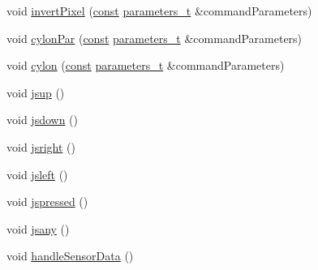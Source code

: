 \begin{DoxyCompactItemize}
\item 
void \hyperlink{class_m_q_t_tsense_h_a_t_ae5172290839c6af0821f41bae9cf30c7}{invert\+Pixel} (\hyperlink{functions__c_8js_afacfd9c985d225bb07483b887a801b6f}{const} \hyperlink{_json_m_q_t_t_8h_ad3b3bd6544a775cf1e31cd71610c5765}{parameters\+\_\+t} \&command\+Parameters)
\item 
void \hyperlink{class_m_q_t_tsense_h_a_t_a0c2faf77463954149558afc54f965f65}{cylon\+Par} (\hyperlink{functions__c_8js_afacfd9c985d225bb07483b887a801b6f}{const} \hyperlink{_json_m_q_t_t_8h_ad3b3bd6544a775cf1e31cd71610c5765}{parameters\+\_\+t} \&command\+Parameters)
\item 
void \hyperlink{class_m_q_t_tsense_h_a_t_ad70cc61332aefd376e2fafd026e51144}{cylon} (\hyperlink{functions__c_8js_afacfd9c985d225bb07483b887a801b6f}{const} \hyperlink{_json_m_q_t_t_8h_ad3b3bd6544a775cf1e31cd71610c5765}{parameters\+\_\+t} \&command\+Parameters)
\item 
void \hyperlink{class_m_q_t_tsense_h_a_t_a5d0f57ce2e94813cfa2279d17e4905ae}{jsup} ()
\item 
void \hyperlink{class_m_q_t_tsense_h_a_t_a49af5e2cafdc045b070601e2046ae32c}{jsdown} ()
\item 
void \hyperlink{class_m_q_t_tsense_h_a_t_a94f4010486bd20e7f1ffd602ab4a6df8}{jsright} ()
\item 
void \hyperlink{class_m_q_t_tsense_h_a_t_ab02c2741dda318559e3f22b85ecd9b28}{jsleft} ()
\item 
void \hyperlink{class_m_q_t_tsense_h_a_t_a4a4c34f1818a47a9e111050cdaf94157}{jspressed} ()
\item 
void \hyperlink{class_m_q_t_tsense_h_a_t_ae4e0f972b1ed819bad5954501b8e2597}{jsany} ()
\item 
void \hyperlink{class_m_q_t_tsense_h_a_t_a86bd30bf5003330703c0eca3d29df629}{handle\+Sensor\+Data} ()
\end{DoxyCompactItemize}
